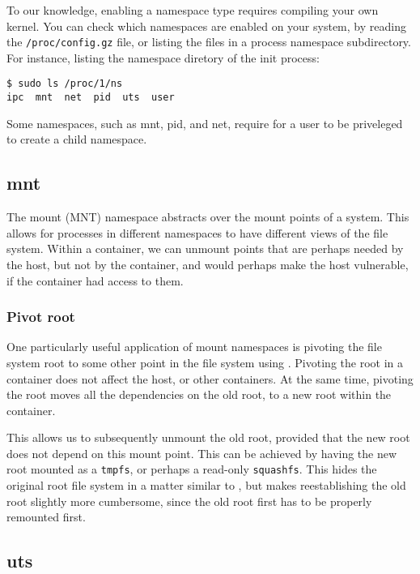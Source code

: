 To our knowledge, enabling a namespace type requires compiling your own kernel.
You can check which namespaces are enabled on your system, by reading the
\texttt{/proc/config.gz} file, or listing the files in a process namespace
subdirectory. For instance, listing the namespace diretory of the init process:

\begin{lstlisting}
$ sudo ls /proc/1/ns
ipc  mnt  net  pid  uts  user
\end{lstlisting}

Some namespaces, such as mnt, pid, and net, require for a user to be priveleged
to create a child namespace.

\subsection{mnt}

The mount (MNT) namespace abstracts over the mount points of a system. This
allows for processes in different namespaces to have different views of the
file system. Within a container, we can unmount points that are perhaps needed
by the host, but not by the container, and would perhaps make the host
vulnerable, if the container had access to them.

\subsubsection{Pivot root}

One particularly useful application of mount namespaces is pivoting the file
system root to some other point in the file system using
\cite{man-2-pivot-root}. Pivoting the root in a container does not affect the
host, or other containers. At the same time, pivoting the root moves all the
dependencies on the old root, to a new root within the container.

This allows us to subsequently unmount the old root, provided that the new root
does not depend on this mount point. This can be achieved by having the new
root mounted as a \texttt{tmpfs}, or perhaps a read-only \texttt{squashfs}.
This hides the original root file system in a matter similar to
\cite{man-2-chroot}, but makes reestablishing the old root slightly more
cumbersome, since the old root first has to be properly remounted first.

\subsection{uts}

